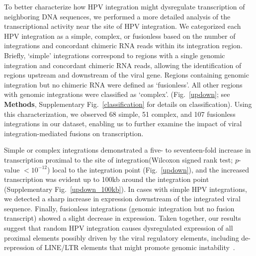 \documentclass[a4,center,fleqn]{NAR}
\begin{document}
To better characterize how HPV integration might dysregulate
transcription of neighboring DNA sequences, we performed a more
detailed analysis of the transcriptional activity near the site of HPV
integration.  We categorized each HPV integration as a simple,
complex, or fusionless based on the number of integrations and
concordant chimeric RNA reads within its integration region.  Briefly,
`simple' integrations correspond to regions with a single genomic
integration and concordant chimeric RNA reads, allowing the
identification of regions upstream and downstream of the viral gene.
Regions containing genomic integration but no chimeric RNA were
defined as `fusionless'. All other regions with genomic integrations
were classified as `complex'.  (Fig.~\ref{updown}; see
\textbf{Methods}, Supplementary Fig.~\ref{classification} for details on
classification). Using this characterization, we observed 68 simple,
51 complex, and 107 fusionless integrations in our dataset, enabling
us to further examine the impact of viral integration-mediated fusions
on transcription.

Simple or complex integrations demonstrated a five- to seventeen-fold
increase in transcription proximal to the site of integration(Wilcoxon
signed rank test; $p$-value $<10^{-12}$) local to the integration point
(Fig.~\ref{updown}), and the increased transcription was evident up to
100kb around the integration point (Supplementary Fig.~\ref{updown_100kb}).  In
cases with simple HPV integrations, we detected a sharp increase in
expression downstream of the integrated viral sequence.  Finally,
fusionless integrations (genomic integration but no fusion transcript)
showed a slight decrease in expression. Taken together, our results
suggest that random HPV integration causes dysregulated expression of
all proximal elements possibly driven by the viral regulatory
elements, including de-repression of LINE/LTR elements that might
promote genomic
instability~\cite{Gasior2006,Romanish2010,Rodic2013,Xiao-Jie2016}.
\end{document}
